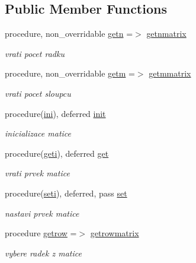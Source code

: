 \subsection*{\-Public \-Member \-Functions}
\begin{DoxyCompactItemize}
\item 
procedure, non\-\_\-overridable \hyperlink{structmtx_1_1matrix_ad43a73f32b347da18f997ce145d6c27c}{getn} =$>$ \hyperlink{classmtx_ab05f486a31448c69570e2144b4010957}{getnmatrix}
\begin{DoxyCompactList}\small\item\em vrati pocet radku \end{DoxyCompactList}\item 
procedure, non\-\_\-overridable \hyperlink{structmtx_1_1matrix_a24f1071ad0cb83094ba23d3027321392}{getm} =$>$ \hyperlink{classmtx_adf266f7c4ef90f6ddc1c654bcad5d149}{getmmatrix}
\begin{DoxyCompactList}\small\item\em vrati pocet sloupcu \end{DoxyCompactList}\item 
procedure(\hyperlink{interfacemtx_1_1ini}{ini}), deferred \hyperlink{structmtx_1_1matrix_a93ca8f74b8962073bdde2cf422abd191}{init}
\begin{DoxyCompactList}\small\item\em inicializace matice \end{DoxyCompactList}\item 
procedure(\hyperlink{interfacemtx_1_1geti}{geti}), deferred \hyperlink{structmtx_1_1matrix_aefbbd3d12a8d6429c183bec463749bda}{get}
\begin{DoxyCompactList}\small\item\em vrati prvek matice \end{DoxyCompactList}\item 
procedure(\hyperlink{interfacemtx_1_1seti}{seti}), deferred, pass \hyperlink{structmtx_1_1matrix_a64b6c3a20c2e85dc715f8cd2f70d6e18}{set}
\begin{DoxyCompactList}\small\item\em nastavi prvek matice \end{DoxyCompactList}\item 
procedure \hyperlink{structmtx_1_1matrix_a99c4dff8cf1c63a968d03474084d0b70}{getrow} =$>$ \hyperlink{classmtx_a46e5fd9002257990ea5c79e1971c8167}{getrowmatrix}
\begin{DoxyCompactList}\small\item\em vybere radek z matice \end{DoxyCompactList}\item 

\end{DoxyCompactItemize}
